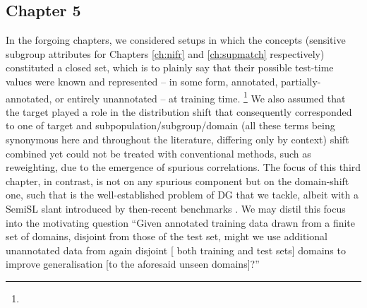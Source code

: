 \subsection*{Chapter 5}%
%
In the forgoing chapters, we considered setups in which the concepts (sensitive subgroup attributes
for Chapters \ref{ch:nifr} and \ref{ch:supmatch} respectively) constituted a closed set, which is
to plainly say that their possible test-time values were known and represented -- in some form,
annotated, partially-annotated, or entirely unannotated -- at training time.
%
\footnote{
}
%
We also assumed that the target played a role in the distribution shift that consequently
corresponded to one of target and subpopulation/subgroup/domain (all these terms being synonymous
here and throughout the literature, differing only by context) shift combined yet could not be
treated with conventional methods, such as reweighting, due to the emergence of spurious
correlations.
%
The focus of this third chapter, in contrast, is not on any spurious component but on the
domain-shift one, such that is the well-established problem of \ac{DG} that we tackle, albeit with
a \ac{SemiSL} slant introduced by then-recent benchmarks \citep{SagWeiLeeGaoetal22}. 
%
We may distil this focus into the motivating question ``Given annotated training data drawn from a
finite set of domains, disjoint from those of the test set, might we use additional unannotated
data from again disjoint [\wrt{} both training and test sets] domains to improve generalisation [to
the aforesaid unseen domains]?''
%


